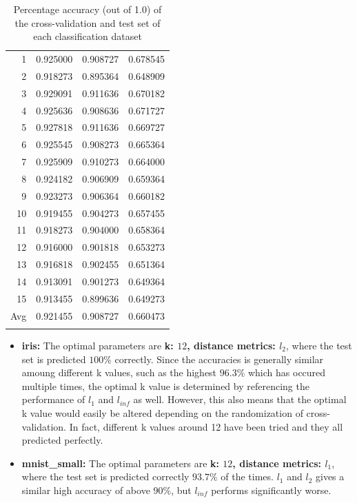 \documentclass{article} %
\begin{document}
\begin{table}[!ht]
\begin{minipage}{0.51\textwidth}
{\begin{tabular}[t]{||r | c c c||}
    \hline
    1  & 0.925000  & 0.908727  & 0.678545 \\
    2  & 0.918273  & 0.895364  & 0.648909 \\
    3\cellcolor{yellow} &\cellcolor{yellow} 0.929091  & 0.911636  & 0.670182 \\
    4  & 0.925636  & 0.908636  & 0.671727 \\
    5  & 0.927818  & 0.911636  & 0.669727 \\
    6   & 0.925545  & 0.908273  & 0.665364 \\
    7   & 0.925909  & 0.910273  & 0.664000 \\
    8   & 0.924182  & 0.906909  & 0.659364 \\
    9   & 0.923273  & 0.906364  & 0.660182 \\
    10  & 0.919455  & 0.904273  & 0.657455 \\
    11  & 0.918273  & 0.904000  & 0.658364 \\
    12  & 0.916000  & 0.901818  & 0.653273 \\
    13  & 0.916818  & 0.902455  & 0.651364 \\
    14  & 0.913091  & 0.901273  & 0.649364 \\
    15  & 0.913455  & 0.899636  & 0.649273 \\
    \hline
    Avg &\cellcolor{cyan} 0.921455  & 0.908727  & 0.660473 \\
    \hline
    \rowcolor{pink}\multicolumn{4}{||c||}{Test Set Accuracy: 0.937}\\
    \hline
  \end{tabular}}
  \end{minipage}
  \caption{Percentage accuracy (out of 1.0) of the cross-validation and test set of each classification dataset}
  \end{table}

  \begin{itemize}
    \item \textbf{iris:} The optimal parameters are \textbf{k: $12$, distance metrics: $l_2$}, where the test set is predicted $100\%$ correctly. Since the accuracies is generally similar amoung different k values, such as the highest $96.3\%$ which has occured multiple times, the optimal k value is determined by referencing the performance of $l_1$ and $l_{inf}$ as well. However, this also means that the optimal k value would easily be altered depending on the randomization of cross-validation. In fact, different k values around 12 have been tried and they all predicted perfectly.
    \item \textbf{mnist\_small:} The optimal parameters are \textbf{k: $12$, distance metrics: $l_1$}, where the test set is predicted correctly $93.7\%$ of the times. $l_1$ and $l_2$ gives a similar high accuracy of above $90\%$, but $l_{inf}$ performs significantly worse.
  \end{itemize}
\end{document}
